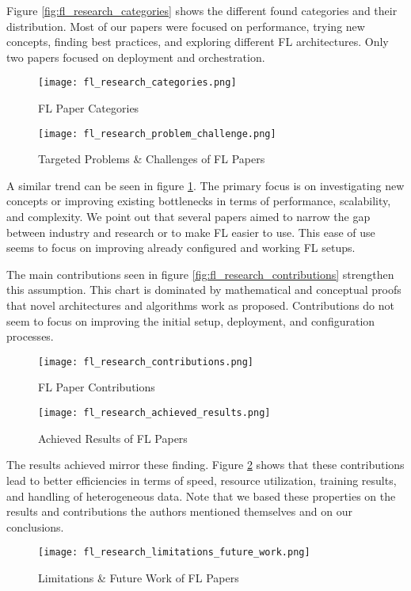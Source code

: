 Figure \ref{fig:fl_research_categories} shows the different found categories and their distribution.
Most of our papers were focused on performance, trying new concepts, finding best practices,
and exploring different FL architectures.
Only two papers focused on deployment and orchestration.
\begin{figure}[p]
    \centering
    \texttt{[image: fl\_research\_categories.png]}
    \caption{FL Paper Categories}
    \label{fig:fl_research_categories}

    \texttt{[image: fl\_research\_problem\_challenge.png]}
    \caption{Targeted Problems \& Challenges of FL Papers}
    \label{fig:fl_research_problem_challenge}
\end{figure}
A similar trend can be seen in figure \ref{fig:fl_research_problem_challenge}.
The primary focus is on investigating new concepts or improving existing bottlenecks
in terms of performance, scalability, and complexity.
We point out that several papers aimed to narrow the gap between industry and research or
to make FL easier to use.
This ease of use seems to focus on improving already configured and working FL setups.

The main contributions seen in figure \ref{fig:fl_research_contributions} strengthen this assumption.
This chart is dominated by mathematical and conceptual proofs that novel
architectures and algorithms work as proposed.
Contributions do not seem to focus on improving the initial setup, deployment, and configuration processes.
\begin{figure}[p]
    \centering
    \texttt{[image: fl\_research\_contributions.png]}
    \caption{FL Paper Contributions}
    \label{fig:fl_research_contributions}

    \texttt{[image: fl\_research\_achieved\_results.png]}
    \caption{Achieved Results of FL Papers}
    \label{fig:fl_research_achieved_results}
\end{figure}
The results achieved mirror these finding.
Figure \ref{fig:fl_research_achieved_results} shows that these contributions
lead to better efficiencies in terms of speed, resource utilization, training results,
and handling of heterogeneous data.
Note that we based these properties on the results and contributions the authors mentioned themselves
and on our conclusions.

\begin{figure}[h]
    \centering
    \texttt{[image: fl\_research\_limitations\_future\_work.png]}
    \caption{Limitations \& Future Work of FL Papers}
    \label{fig:fl_research_limitations_future_work}
\end{figure}

